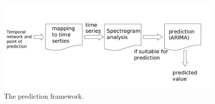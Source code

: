  
 \begin{figure}[!ht]
  \begin{center}
  \includegraphics[width=0.95\columnwidth, angle=0]{./texfiles/Chapter_1/fig/Prediction.pdf}
  \caption{\label{fig:e_pred}The prediction framework.}
  \end{center}
 \end{figure}


